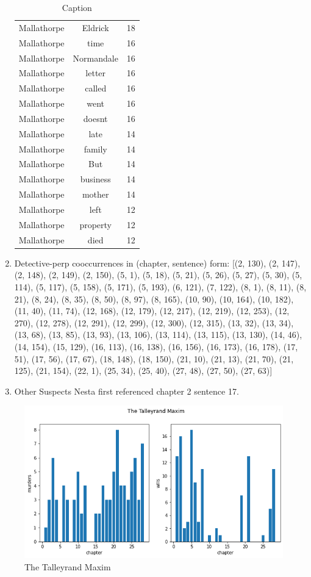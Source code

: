 \documentclass{article}
\begin{document}
\begin{enumerate}
\begin{table}[]
\begin{tabular}{c|c|c}
Mallathorpe & Eldrick & 18 \\
Mallathorpe & time & 16 \\
Mallathorpe & Normandale & 16 \\
Mallathorpe & letter & 16 \\
Mallathorpe & called & 16 \\
Mallathorpe & went & 16 \\
Mallathorpe & doesnt & 16 \\
Mallathorpe & late & 14 \\
Mallathorpe & family & 14 \\
Mallathorpe & But & 14 \\
Mallathorpe & business & 14 \\
Mallathorpe & mother & 14 \\
Mallathorpe & left & 12 \\
Mallathorpe & property & 12 \\
Mallathorpe & died & 12 \\
        \end{tabular}
        \caption{Caption}
        \label{tab:talleyrand}
    \end{table}
    \item Detective-perp cooccurrences in (chapter, sentence) form: [(2, 130), (2, 147), (2, 148), (2, 149), (2, 150), (5, 1), (5, 18), (5, 21), (5, 26), (5, 27), (5, 30), (5, 114), (5, 117), (5, 158), (5, 171), (5, 193), (6, 121), (7, 122), (8, 1), (8, 11), (8, 21), (8, 24), (8, 35), (8, 50), (8, 97), (8, 165), (10, 90), (10, 164), (10, 182), (11, 40), (11, 74), (12, 168), (12, 179), (12, 217), (12, 219), (12, 253), (12, 270), (12, 278), (12, 291), (12, 299), (12, 300), (12, 315), (13, 32), (13, 34), (13, 68), (13, 85), (13, 93), (13, 106), (13, 114), (13, 115), (13, 130), (14, 46), (14, 154), (15, 129), (16, 113), (16, 138), (16, 156), (16, 173), (16, 178), (17, 51), (17, 56), (17, 67), (18, 148), (18, 150), (21, 10), (21, 13), (21, 70), (21, 125), (21, 154), (22, 1), (25, 34), (25, 40), (27, 48), (27, 50), (27, 63)]  \\
    \item Other Suspects Nesta first referenced chapter 2 sentence 17.
\end{enumerate}

\begin{figure}[htbp] 
			\centering \includegraphics[width=0.65\columnwidth]{images/talleyrandmaxim.png}
			\caption{
				\label{fig:The Talleyrand Maxim} 
				The Talleyrand Maxim
			}
\end{figure}
\end{document}
